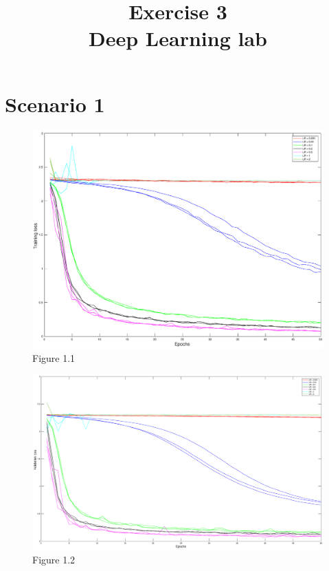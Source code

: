 \documentclass{article}
\title{  Exercise 3 \\
        \large Deep Learning lab}
\date{}
\begin{document}
\maketitle

\section*{Scenario 1}
	\begin{figure}[!htb]
        \centering
        \includegraphics[width=\textwidth]{figures/sc1_tr_loss}
        \captionsetup{labelformat=empty}
        \caption{Figure 1.1}
    \end{figure}
    \begin{figure}[!htb]
        \centering
        \includegraphics[width=\textwidth]{figures/sc1_val_loss}
        \captionsetup{labelformat=empty}
        \caption{Figure 1.2}
    \end{figure}
\end{document}
